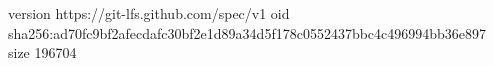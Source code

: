 version https://git-lfs.github.com/spec/v1
oid sha256:ad70fc9bf2afecdafc30bf2e1d89a34d5f178c0552437bbc4c496994bb36e897
size 196704
